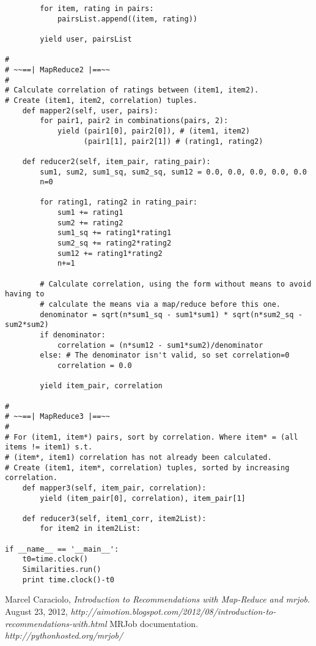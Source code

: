 \documentclass{article}
\begin{document}
\begin{verbatim}
        for item, rating in pairs:
            pairsList.append((item, rating))

        yield user, pairsList

#
# ~~==| MapReduce2 |==~~
#
# Calculate correlation of ratings between (item1, item2).
# Create (item1, item2, correlation) tuples.
    def mapper2(self, user, pairs):
        for pair1, pair2 in combinations(pairs, 2):
            yield (pair1[0], pair2[0]), # (item1, item2)
                  (pair1[1], pair2[1]) # (rating1, rating2)

    def reducer2(self, item_pair, rating_pair):
        sum1, sum2, sum1_sq, sum2_sq, sum12 = 0.0, 0.0, 0.0, 0.0, 0.0
        n=0

        for rating1, rating2 in rating_pair:
            sum1 += rating1
            sum2 += rating2
            sum1_sq += rating1*rating1
            sum2_sq += rating2*rating2
            sum12 += rating1*rating2
            n+=1

        # Calculate correlation, using the form without means to avoid having to
        # calculate the means via a map/reduce before this one.
        denominator = sqrt(n*sum1_sq - sum1*sum1) * sqrt(n*sum2_sq - sum2*sum2)
        if denominator:
            correlation = (n*sum12 - sum1*sum2)/denominator
        else: # The denominator isn't valid, so set correlation=0
            correlation = 0.0

        yield item_pair, correlation

#
# ~~==| MapReduce3 |==~~
#
# For (item1, item*) pairs, sort by correlation. Where item* = (all items != item1) s.t.
# (item*, item1) correlation has not already been calculated.
# Create (item1, item*, correlation) tuples, sorted by increasing correlation.
    def mapper3(self, item_pair, correlation):
        yield (item_pair[0], correlation), item_pair[1]

    def reducer3(self, item1_corr, item2List):
        for item2 in item2List:
        
if __name__ == '__main__':
    t0=time.clock()
    Similarities.run()
    print time.clock()-t0
\end{verbatim}

\begin{thebibliography}{9}
  Marcel Caraciolo,
  \emph{Introduction to Recommendations with Map-Reduce and mrjob}.
  August 23, 2012, \textit{http://aimotion.blogspot.com/2012/08/introduction-to-recommendations-with.html}
MRJob documentation.
\textit{http://pythonhosted.org/mrjob/}
\end{thebibliography}
\end{document}
